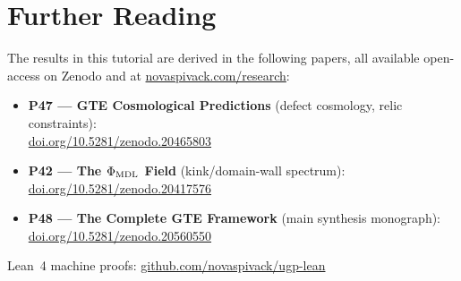 \documentclass[11pt,a4paper]{article}
\begin{document}
\section*{Further Reading}
\begin{tcolorbox}[colback=orange!8,colframe=orange!50!black,
  title=\textbf{Primary Sources}]
The results in this tutorial are derived in the following papers,
all available open-access on Zenodo and at
\href{https://novaspivack.com/research}{novaspivack.com/research}:
\begin{itemize}
  \item \textbf{P47 --- GTE Cosmological Predictions} (defect cosmology, relic constraints):\\
        \href{https://doi.org/10.5281/zenodo.20465803}{doi.org/10.5281/zenodo.20465803}
  \item \textbf{P42 --- The $\Phi_{\rm MDL}$ Field} (kink/domain-wall spectrum):\\
        \href{https://doi.org/10.5281/zenodo.20417576}{doi.org/10.5281/zenodo.20417576}
  \item \textbf{P48 --- The Complete GTE Framework} (main synthesis monograph):\\
        \href{https://doi.org/10.5281/zenodo.20560550}{doi.org/10.5281/zenodo.20560550}
\end{itemize}
Lean~4 machine proofs: \href{https://github.com/novaspivack/ugp-lean}{github.com/novaspivack/ugp-lean}
\end{tcolorbox}


\end{document}
